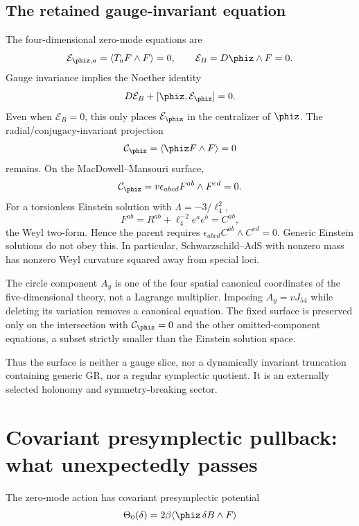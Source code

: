 \subsection{The retained gauge-invariant equation}

The four-dimensional zero-mode equations are
\[
\mathcal E_{\phiz,a}=\langle T_aF\wedge F\rangle=0,
\qquad
\mathcal E_B=D\phiz\wedge F=0.
\]
Gauge invariance implies the Noether identity
\[
D\mathcal E_B+[\phiz,\mathcal E_{\phiz}]=0.
\]
Even when $\mathcal E_B=0$, this only places $\mathcal E_{\phiz}$ in the centralizer of $\phiz$.  The radial/conjugacy-invariant projection
\[
\mathcal C_{\phiz}=\langle\phiz F\wedge F\rangle=0
\]
remains.  On the MacDowell--Mansouri surface,
\[
\mathcal C_{\phiz}=v\epsilon_{abcd}F^{ab}\wedge F^{cd}=0.
\]
For a torsionless Einstein solution with $\Lambda=-3/\ell_4^2$,
\[
F^{ab}=R^{ab}+\ell_4^{-2}e^ae^b=C^{ab},
\]
the Weyl two-form.  Hence the parent requires $\epsilon_{abcd}C^{ab}\wedge C^{cd}=0$.  Generic Einstein solutions do not obey this.  In particular, Schwarzschild--AdS with nonzero mass has nonzero Weyl curvature squared away from special loci.

The circle component $A_y$ is one of the four spatial canonical coordinates of the five-dimensional theory, not a Lagrange multiplier.  Imposing $A_y=vJ_{54}$ while deleting its variation removes a canonical equation.  The fixed surface is preserved only on the intersection with $\mathcal C_{\phiz}=0$ and the other omitted-component equations, a subset strictly smaller than the Einstein solution space.

Thus the surface is neither a gauge slice, nor a dynamically invariant truncation containing generic GR, nor a regular symplectic quotient.  It is an externally selected holonomy and symmetry-breaking sector.

\section{Covariant presymplectic pullback: what unexpectedly passes}
\label{sec:symplectic}

The zero-mode action has covariant presymplectic potential
\[
\Theta_0(\delta)=2\beta\langle\phiz\,\delta B\wedge F\rangle
\]
